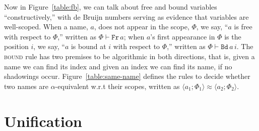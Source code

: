 \documentclass[a4paper,UKenglish]{lipics-v2016}
\newcommand{\clos}[2] {
  \langle #1; #2 \rangle
}
\newcommand{\aeq}[4] {
  \clos{#1}{#2} \approx \clos{#3}{#4}
}
\newcommand*{\transname}[1]{\textsc{#1}}
\begin{document}
Now in Figure~\ref{table:fb}, we can talk about free and bound
variables ``constructively,'' with de Bruijn numbers serving as
evidence that variables are well-scoped.  When a name, $a$, does not
appear in the scope, $\Phi$, we say, ``$a$ is free with respect to
$\Phi$,'' written as $\Phi \vdash \texttt{Fr}\, a$; when $a$'s first
appearance in $\Phi$ is the position $i$, we say, ``$a$ is bound at
$i$ with respect to $\Phi$,'' written as $\Phi \vdash \texttt{Bd}\,
a\,i$.  The \transname{bound} rule has two premises to be algorithmic
in both directions, that is, given a name we can find its index and
given an index we can find its name, if no shadowings occur.
Figure~\ref{table:same-name} defines the rules to decide whether two
names are $\alpha$-equivalent w.r.t their scopes, written as
$\aeq{a_1}{\Phi_1}{a_2}{\Phi_2}$.

\pagebreak

\section{Unification}
\label{unify}
\end{document}
